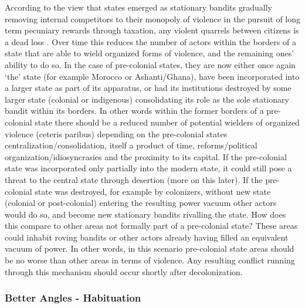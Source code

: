 \documentclass[12pt]{article}
\begin{document}
\begin{multicols}{2}
According to the view that states emerged as stationary bandits gradually
removing internal competitors to their monopoly of violence in the pursuit of
long term pecuniary rewards through taxation, any violent quarrels between
citizens is a dead loss \citep{Olson1993, tilly_1985}. Over time this reduces
the number of actors within the borders of a state that are able to wield
organized forms of violence, and the remaining ones' ability to do so. In the
case of pre-colonial states, they are now either once again `the' state (for
example Morocco or Ashanti/Ghana), have been incorporated into a larger state as
part of its apparatus, or had its institutions destroyed by some larger state
(colonial or indigenous) consolidating its role as the sole stationary bandit
within its borders. In other words within the former borders of a pre-colonial
state there should be a reduced number of potential wielders of organized
violence (ceteris paribus) depending on the pre-colonial states
centralization/consolidation, itself a product of time, reforms/political
organization/idiosyncrasies and the proximity to its capital. If the
pre-colonial state was incorporated only partially into the modern state, it
could still pose a threat to the central state through desertion (more on this
later). If the pre-colonial state was destroyed, for example by colonizers,
without new state (colonial or post-colonial) entering the resulting power
vacuum other actors would do so, and become new stationary bandits rivalling the
state. How does this compare to other areas not formally part of a pre-colonial
state? These areas could inhabit roving bandits \citep{Scott2009} or other
actors already having filled an equivalent vacuum of power. In other words, in
this scenario pre-colonial state areas should be no worse than other areas in
terms of violence. Any resulting conflict running through this mechanism should
occur shortly after decolonization.

\subsubsection{Better Angles - Habituation}



\end{multicols}
\end{document}
